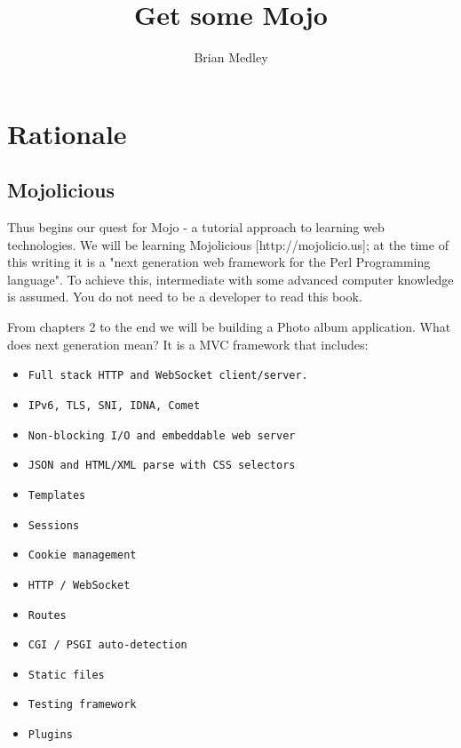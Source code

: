 \documentclass[16pt,pdftex]{book}
\begin{document}
\title{Get some Mojo}
\author{Brian Medley}

\frontmatter
\maketitle
\tableofcontents

\mainmatter

\chapter*{Rationale}

\section{Mojolicious}

Thus begins our quest for Mojo - a tutorial approach to learning web
technologies. We will be learning Mojolicious [http://mojolicio.us]; at the
time of this writing it is a "next generation web framework for the Perl
Programming language". To achieve this, intermediate with some advanced
computer knowledge is assumed. You do not need to be a developer to read this
book.

From chapters 2 to the end we will be building a Photo album application. What
does next generation mean? It is a MVC framework that includes:

\begin{itemize}
\item \verb|Full stack HTTP and WebSocket client/server.|
\item \verb|IPv6, TLS, SNI, IDNA, Comet|
\item \verb|Non-blocking I/O and embeddable web server|
\item \verb|JSON and HTML/XML parse with CSS selectors|
\item \verb|Templates|
\item \verb|Sessions|
\item \verb|Cookie management|
\item \verb|HTTP / WebSocket|
\item \verb|Routes|
\item \verb|CGI / PSGI auto-detection|
\item \verb|Static files|
\item \verb|Testing framework|
\item \verb|Plugins|
\end{itemize}
\end{document}

